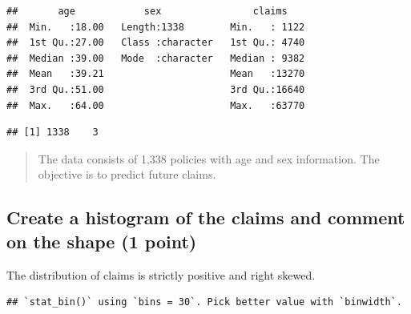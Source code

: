\documentclass[]{book}
\newenvironment{Shaded}{\begin{snugshade}}{\end{snugshade}}
\newcommand{\KeywordTok}[1]{\textcolor[rgb]{0.13,0.29,0.53}{\textbf{#1}}}
\newcommand{\NormalTok}[1]{#1}
\newcommand{\OperatorTok}[1]{\textcolor[rgb]{0.81,0.36,0.00}{\textbf{#1}}}
\newcommand{\StringTok}[1]{\textcolor[rgb]{0.31,0.60,0.02}{#1}}
\begin{document}
\begin{verbatim}
##       age            sex                claims     
##  Min.   :18.00   Length:1338        Min.   : 1122  
##  1st Qu.:27.00   Class :character   1st Qu.: 4740  
##  Median :39.00   Mode  :character   Median : 9382  
##  Mean   :39.21                      Mean   :13270  
##  3rd Qu.:51.00                      3rd Qu.:16640  
##  Max.   :64.00                      Max.   :63770
\end{verbatim}

\begin{Shaded}
\end{Shaded}

\begin{verbatim}
## [1] 1338    3
\end{verbatim}

\begin{quote}
The data consists of 1,338 policies with age and sex information. The objective is to predict future claims.
\end{quote}

\hypertarget{create-a-histogram-of-the-claims-and-comment-on-the-shape-1-point}{%
\subsection{Create a histogram of the claims and comment on the shape (1 point)}\label{create-a-histogram-of-the-claims-and-comment-on-the-shape-1-point}}

The distribution of claims is strictly positive and right skewed.

\begin{Shaded}
\end{Shaded}

\begin{verbatim}
## `stat_bin()` using `bins = 30`. Pick better value with `binwidth`.
\end{verbatim}
\end{document}
